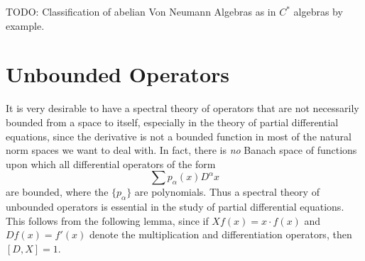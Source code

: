 TODO: Classification of abelian Von Neumann Algebras as in $C^*$ algebras by example.










\begin{comment}


\begin{theorem}
    Let $X$ be a compact Hausdorff space, every representation of $C(X)$ is unitarily equivalent to a representation $\pi: C(X) \to B(L^2(Z,\mu))$, where $Z$ is a disjoint union of copies of $X$, with $\mu$ acting as a Borel probability measure on each copy, such that $\pi(f)$ is given by multiplication by $f$ on each copy of $X$.
\end{theorem}



\begin{corollary}
    Let $\AC$ be a unital commutative $C^*$ subalgebra of $B(H)$, for some Hilbert space $H$. Then there exists a semifinite measure space $X$, a unitary map $U: H \to L^2(X)$, and a homomorphism $\Phi: \AC \to L^\infty(X,\mu)$ such that for each $T \in \AC$,
    \[ UTU^{-1} f = \Phi(T) f. \]
    The space $X$ can be taken as a disjoint union of copies of $\sigma(\AC)$, $\mu$ acts as a Borel probability measure on each copy, and $\Phi(T) = \widehat{T}$ on each copy. We require only countably many copies if $\AC$ is separable.
\end{corollary}

\end{comment}





















\chapter{Unbounded Operators}

It is very desirable to have a spectral theory of operators that are not necessarily bounded from a space to itself, especially in the theory of partial differential equations, since the derivative is not a bounded function in most of the natural norm spaces we want to deal with. In fact, there is \emph{no} Banach space of functions upon which all differential operators of the form
%
\[ \sum p_\alpha(x) D^\alpha x \]
%
are bounded, where the $\{ p_\alpha \}$ are polynomials. Thus a spectral theory of unbounded operators is essential in the study of partial differential equations. This follows from the following lemma, since if $Xf(x) = x \cdot f(x)$ and $Df(x) = f'(x)$ denote the multiplication and differentiation operators, then $[D,X] = 1$.

